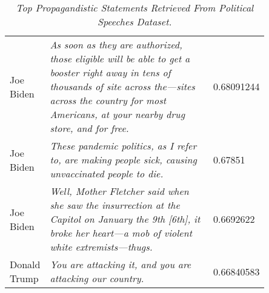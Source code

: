 \begin{table*}
\begin{tabular}{p{0.13\linewidth}p{0.72\linewidth}l}
Joe Biden           & \textit{As soon as they are authorized, those eligible will be able to get a booster right away in tens of thousands of site across the---sites across the country for most Americans, at your nearby drug store, and for free.}       & 0.68091244                                                                                                                     \\
Joe Biden           & \textit{These pandemic politics, as I refer to, are making people sick, causing unvaccinated people to die.}   & 0.67851 \\
Joe Biden           & \textit{Well, Mother Fletcher said when she saw the insurrection at the Capitol on January the 9th [6th], it broke her heart—a mob of violent white extremists—thugs.}       & 0.6692622                                                            \\
Donald Trump        & \textit{You are attacking it, and you are attacking our country.}       & 0.66840583                                           
\end{tabular}
\caption{\emph{Top Propagandistic Statements Retrieved From Political Speeches Dataset.}
\label{table:top15}
   }
\end{table*}